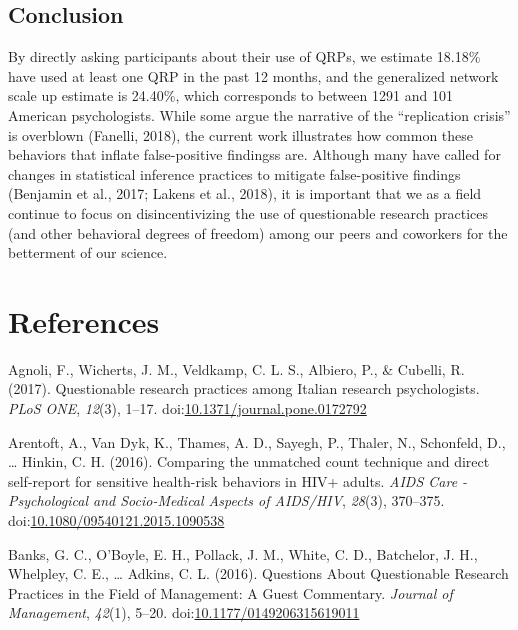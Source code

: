 \documentclass[,jou]{apa6}
\theoremstyle{definition}
\theoremstyle{definition}
\theoremstyle{definition}
\theoremstyle{remark}
\begin{document}
\subsection{Conclusion}\label{conclusion}

By directly asking participants about their use of QRPs, we estimate
18.18\% have used at least one QRP in the past 12 months, and the
generalized network scale up estimate is 24.40\%, which corresponds to
between 1291 and 101 American psychologists. While some argue the
narrative of the \enquote{replication crisis} is overblown (Fanelli,
2018), the current work illustrates how common these behaviors that
inflate false-positive findingss are. Although many have called for
changes in statistical inference practices to mitigate false-positive
findings (Benjamin et al., 2017; Lakens et al., 2018), it is important
that we as a field continue to focus on disincentivizing the use of
questionable research practices (and other behavioral degrees of
freedom) among our peers and coworkers for the betterment of our
science.

\newpage

\section{References}\label{references}

\begingroup
\setlength{\parindent}{-0.5in} \setlength{\leftskip}{0.5in}

\hypertarget{refs}{}
\hypertarget{ref-Agnoli2017}{}
Agnoli, F., Wicherts, J. M., Veldkamp, C. L. S., Albiero, P., \&
Cubelli, R. (2017). Questionable research practices among Italian
research psychologists. \emph{PLoS ONE}, \emph{12}(3), 1--17.
doi:\href{https://doi.org/10.1371/journal.pone.0172792}{10.1371/journal.pone.0172792}

\hypertarget{ref-Arentoft2016}{}
Arentoft, A., Van Dyk, K., Thames, A. D., Sayegh, P., Thaler, N.,
Schonfeld, D., \ldots{} Hinkin, C. H. (2016). Comparing the unmatched
count technique and direct self-report for sensitive health-risk
behaviors in HIV+ adults. \emph{AIDS Care - Psychological and
Socio-Medical Aspects of AIDS/HIV}, \emph{28}(3), 370--375.
doi:\href{https://doi.org/10.1080/09540121.2015.1090538}{10.1080/09540121.2015.1090538}

\hypertarget{ref-Banks2016}{}
Banks, G. C., O'Boyle, E. H., Pollack, J. M., White, C. D., Batchelor,
J. H., Whelpley, C. E., \ldots{} Adkins, C. L. (2016). Questions About
Questionable Research Practices in the Field of Management: A Guest
Commentary. \emph{Journal of Management}, \emph{42}(1), 5--20.
doi:\href{https://doi.org/10.1177/0149206315619011}{10.1177/0149206315619011}
\end{document}
